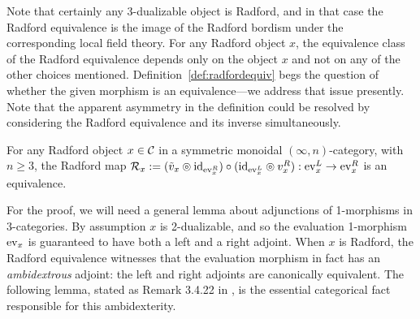 \documentclass{amsart}
\begin{document}
Note that certainly any 3-dualizable object is Radford, and in that case the Radford equivalence is the image of the Radford bordism under the corresponding local field theory.  For any Radford object $x$, the equivalence class of the Radford equivalence depends only on the object $x$ and not on any of the other choices mentioned.  Definition~\ref{def:radfordequiv} begs the question of whether the given morphism is an equivalence---we address that issue presently.  Note that the apparent asymmetry in the definition could be resolved by considering the Radford equivalence and its inverse simultaneously.

\begin{theorem} \label{thm:Cat_Radford}
For any Radford object $x \in \mathcal C$ in a symmetric monoidal $(\infty,n)$-category, with $n \geq 3$, the Radford map $\mathcal R_x := (\tilde{v}_x \circledcirc \mathrm{id}_{\mathrm{ev}_x^R})\circ (\mathrm{id}_{\mathrm{ev}_x^L} \circledcirc v_x^R) : \mathrm{ev}_x^L \rightarrow \mathrm{ev}_x^R$ is an equivalence.
\end{theorem}

For the proof, we will need a general lemma about adjunctions of 1-morphisms in 3-categories.  By assumption $x$ is 2-dualizable, and so the evaluation 1-morphism $\mathrm{ev}_x$ is guaranteed to have both a left and a right adjoint.  When $x$ is Radford, the Radford equivalence witnesses that the evaluation morphism in fact has an \emph{ambidextrous} adjoint: the left and right adjoints are canonically equivalent.  The following lemma, stated as Remark 3.4.22 in \cite{lurie-ch}, is the essential categorical fact responsible for this ambidexterity.
\end{document}
